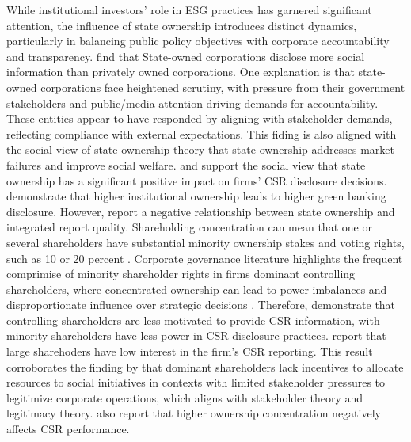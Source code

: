 \documentclass[
  authoryear]{elsarticle}
\begin{document}
While institutional investors' role in ESG practices has garnered
significant attention, the influence of state ownership introduces
distinct dynamics, particularly in balancing public policy objectives
with corporate accountability and transparency. \citet{TAGESSON2009}
find that State-owned corporations disclose more social information than
privately owned corporations. One explanation is that state-owned
corporations face heightened scrutiny, with pressure from their
government stakeholders and public/media attention driving demands for
accountability. These entities appear to have responded by aligning with
stakeholder demands, reflecting compliance with external expectations.
This fiding is also aligned with the social view of state ownership
theory \citep[see][]{STIGLITZ1993} that state ownership addresses market
failures and improve social welfare. \citet{LAU2016} and
\citet{ZHOU2019} support the social view that state ownership has a
significant positive impact on firms' CSR disclosure decisions.
\citet{BOSE2018} demonstrate that higher institutional ownership leads
to higher green banking disclosure. However, \citet{RAIMO2020} report a
negative relationship between state ownership and integrated report
quality. Shareholding concentration can mean that one or several
shareholders have substantial minority ownership stakes and voting
rights, such as 10 or 20 percent \citep{SHLEIFER1997}. Corporate
governance literature highlights the frequent comprimise of minority
shareholder rights in firms dominant controlling shareholders, where
concentrated ownership can lead to power imbalances and disproportionate
influence over strategic decisions \citep{SMITH2022}. Therefore,
\citet{SMITH2022} demonstrate that controlling shareholders are less
motivated to provide CSR information, with minority shareholders have
less power in CSR disclosure practices. \citet{BORGES2024} report that
large sharehoders have low interest in the firm's CSR reporting. This
result corroborates the finding by \citet{DUCASSY2015} that dominant
shareholders lack incentives to allocate resources to social initiatives
in contexts with limited stakeholder pressures to legitimize corporate
operations, which aligns with stakeholder theory and legitimacy theory.
\citet{LAU2016} also report that higher ownership concentration
negatively affects CSR performance.
\end{document}
